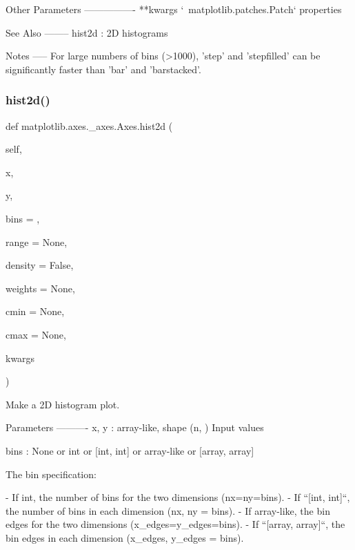 \begin{DoxyVerb}
\begin{DoxyVerb}
Other Parameters
----------------
**kwargs
    `~matplotlib.patches.Patch` properties

See Also
--------
hist2d : 2D histograms

Notes
-----
For large numbers of bins (>1000), 'step' and 'stepfilled' can be
significantly faster than 'bar' and 'barstacked'.\end{DoxyVerb}
 \mbox{\label{classmatplotlib_1_1axes_1_1__axes_1_1Axes_af2fec46fafae2b229dd3f4868c36138d}} 
\subsubsection{\texorpdfstring{hist2d()}{hist2d()}}
{\footnotesize\ttfamily def matplotlib.\+axes.\+\_\+axes.\+Axes.\+hist2d (\begin{DoxyParamCaption}\item[{}]{self,  }\item[{}]{x,  }\item[{}]{y,  }\item[{}]{bins = {},  }\item[{}]{range = {\ttfamily None},  }\item[{}]{density = {\ttfamily False},  }\item[{}]{weights = {\ttfamily None},  }\item[{}]{cmin = {\ttfamily None},  }\item[{}]{cmax = {\ttfamily None},  }\item[{}]{kwargs }\end{DoxyParamCaption})}

\begin{DoxyVerb}Make a 2D histogram plot.

Parameters
----------
x, y : array-like, shape (n, )
    Input values

bins : None or int or [int, int] or array-like or [array, array]

    The bin specification:

    - If int, the number of bins for the two dimensions
      (nx=ny=bins).
    - If ``[int, int]``, the number of bins in each dimension
      (nx, ny = bins).
    - If array-like, the bin edges for the two dimensions
      (x_edges=y_edges=bins).
    - If ``[array, array]``, the bin edges in each dimension
      (x_edges, y_edges = bins).


\end{DoxyVerb}
\end{DoxyVerb}
